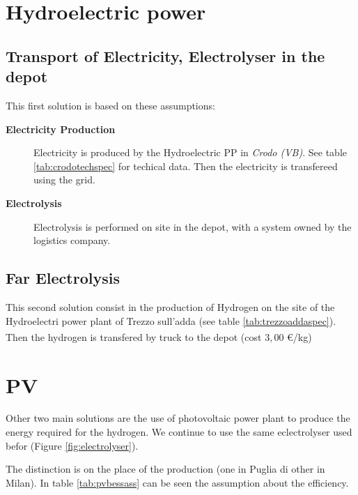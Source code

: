 \section{Hydroelectric power}
\subsection{Transport of Electricity, Electrolyser in the depot}

This first solution is based on these assumptions:

\begin{description}
    \item[\textbf{Electricity Production}]  Electricity is produced by the Hydroelectric PP in \textit{Crodo (VB)}. See table \ref{tab:crodotechspec} for techical data. Then the electricity is transfereed using the grid.
    \item[\textbf{Electrolysis}]  Electrolysis is performed on site in the depot, with a system owned by the logistics company.
\end{description}




%

\subsection{Far Electrolysis}
This second solution consist in the production of Hydrogen on the site of the Hydroelectri power plant of Trezzo sull'adda (see table \ref{tab:trezzoaddaspec}). Then the hydrogen is transfered by truck to the depot (cost $3,00$ €/kg\textsuperscript{\cite{pianoidrogeno}}) 
%




\section{PV}
Other two main solutions are the use of photovoltaic power plant to produce the energy required for the hydrogen. We continue to use the same eclectrolyser used befor (Figure \ref{fig:electrolyser}).

The distinction is on the place of the production (one in Puglia di other in Milan). In table \ref{tab:pvbessass} can be seen the assumption about the efficiency.

